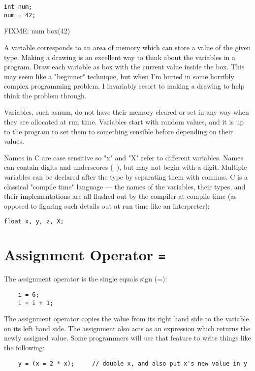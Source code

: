 \begin{lstlisting}
int num;
num = 42;
\end{lstlisting}

FIXME: num box(42)
   
A variable corresponds to an area of memory which can store a value of the given type. Making a drawing is an excellent way to think about the variables in a program. Draw each variable as box with the current value inside the box. This may seem like a "beginner" technique, but when I'm buried in some horribly complex programming problem, I invariably resort to making a drawing to help think the problem through.

Variables, such asnum, do not have their memory cleared or set in any way when they are allocated at run time. Variables start with random values, and it is up to the program to set them to something sensible before depending on their values.

Names in C are case sensitive so "x" and "X" refer to different variables. Names can contain digits and underscores (\lstinline{_}), but may not begin with a digit. Multiple variables can be declared after the type by separating them with commas. C is a classical "compile time" language --- the names of the variables, their types, and their implementations are all flushed out by the compiler at compile time (as opposed to figuring such details out at run time like an interpreter):

\begin{lstlisting}
float x, y, z, X;
\end{lstlisting}

\section{Assignment Operator \lstinline{=}}

The assignment operator is the single equals sign (=):

\begin{lstlisting}
    i = 6;
    i = i + 1;
\end{lstlisting}

The assignment operator copies the value from its right hand side to the variable on its left hand side. The assignment also acts as an expression which returns the newly assigned value. Some programmers will use that feature to write things like the following:

\begin{lstlisting}
    y = (x = 2 * x);     // double x, and also put x's new value in y
\end{lstlisting}

